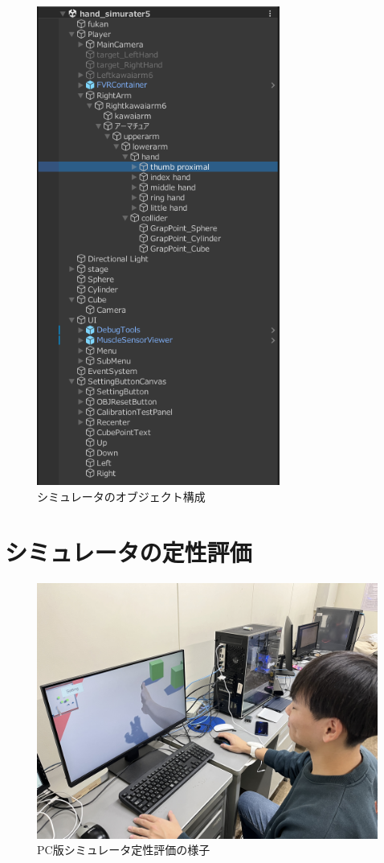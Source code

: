 \documentclass{ltjsreport}
\begin{document}
		\begin{figure}[H]
		\centering
		\includegraphics[width = 8cm]{../figs/UnityObject.png}
		\caption{シミュレータのオブジェクト構成}
		\label{fig:object}
		\end{figure}

	\section{シミュレータの定性評価}
		\begin{figure}[H]
		\centering
		\includegraphics[width = 12cm]{../figs/IMG_5132.JPG}
		\caption{PC版シミュレータ定性評価の様子}
		\label{fig:evaluation}
		\end{figure}
\end{document}
